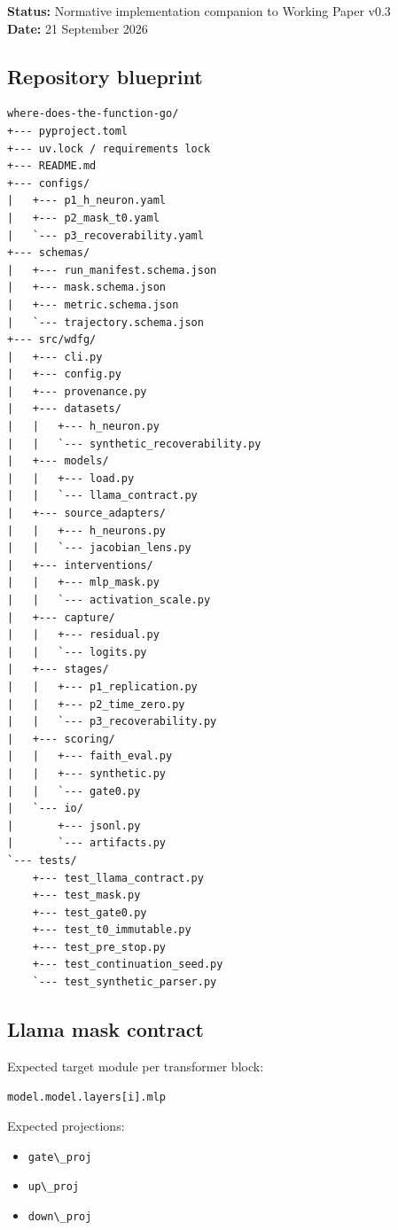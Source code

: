 
\textbf{Status:} Normative implementation companion to Working Paper v0.3\\
\textbf{Date:} 21 September 2026

\subsection{Repository blueprint}\label{repository-blueprint}

\begin{lstlisting}
where-does-the-function-go/
+--- pyproject.toml
+--- uv.lock / requirements lock
+--- README.md
+--- configs/
|   +--- p1_h_neuron.yaml
|   +--- p2_mask_t0.yaml
|   `--- p3_recoverability.yaml
+--- schemas/
|   +--- run_manifest.schema.json
|   +--- mask.schema.json
|   +--- metric.schema.json
|   `--- trajectory.schema.json
+--- src/wdfg/
|   +--- cli.py
|   +--- config.py
|   +--- provenance.py
|   +--- datasets/
|   |   +--- h_neuron.py
|   |   `--- synthetic_recoverability.py
|   +--- models/
|   |   +--- load.py
|   |   `--- llama_contract.py
|   +--- source_adapters/
|   |   +--- h_neurons.py
|   |   `--- jacobian_lens.py
|   +--- interventions/
|   |   +--- mlp_mask.py
|   |   `--- activation_scale.py
|   +--- capture/
|   |   +--- residual.py
|   |   `--- logits.py
|   +--- stages/
|   |   +--- p1_replication.py
|   |   +--- p2_time_zero.py
|   |   `--- p3_recoverability.py
|   +--- scoring/
|   |   +--- faith_eval.py
|   |   +--- synthetic.py
|   |   `--- gate0.py
|   `--- io/
|       +--- jsonl.py
|       `--- artifacts.py
`--- tests/
    +--- test_llama_contract.py
    +--- test_mask.py
    +--- test_gate0.py
    +--- test_t0_immutable.py
    +--- test_pre_stop.py
    +--- test_continuation_seed.py
    `--- test_synthetic_parser.py
\end{lstlisting}

\subsection{Llama mask contract}\label{llama-mask-contract}

Expected target module per transformer block:

\passthrough{\lstinline!model.model.layers[i].mlp!}

Expected projections:

\begin{itemize}
\tightlist
\item
  \passthrough{\lstinline!gate\_proj!}
\item
  \passthrough{\lstinline!up\_proj!}
\item
  \passthrough{\lstinline!down\_proj!}
\end{itemize}

